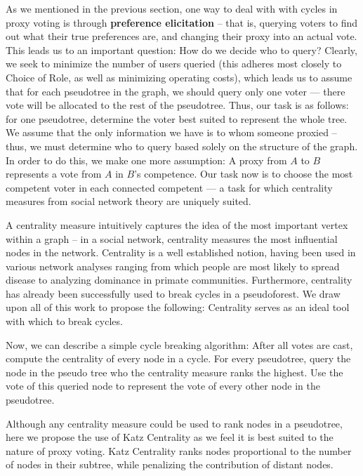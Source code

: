 \documentclass[10pt]{article}
\theoremstyle{definition}
\begin{document}
As we mentioned in the previous section, one way to deal with with cycles in proxy voting is through \textbf{preference elicitation} -- that is, querying voters to find out what their true preferences are, and changing their proxy into an actual vote. This leads us to an important question: How do we decide who to query? Clearly, we seek to minimize the number of users queried (this adheres most closely to Choice of Role, as well as minimizing operating costs), which leads us to assume that for each pseudotree in the graph, we should query only one voter --- there vote will be allocated to the rest of the pseudotree. Thus, our task is as follows: for one pseudotree, determine the voter best suited to represent the whole tree. We assume that the only information we have is to whom someone proxied -- thus, we must determine who to query based solely on the structure of the graph. In order to do this, we make one more assumption: A proxy from $A$ to $B$ represents a vote from $A$ in $B$'s competence. Our task now is to choose the most competent voter in each connected competent --- a task for which centrality measures from social network theory are uniquely suited.

A centrality measure intuitively captures the idea of the most important vertex within a graph -- in a social network, centrality measures the most influential nodes in the network.\cite{centrality}\cite{cwiki} Centrality is a well established notion, having been used in various network analyses ranging from which people are most likely to spread disease to analyzing dominance in primate communities. Furthermore, centrality has already been successfully used to break cycles in a pseudoforest.\cite{wikipedia} We draw upon all of this work to propose the following: Centrality serves as an ideal tool with which to break cycles. 

Now, we can describe a simple cycle breaking algorithm: After all votes are cast, compute the centrality of every node in a cycle. For every pseudotree, query the node in the pseudo tree who the centrality measure ranks the highest. Use the vote of this queried node to represent the vote of every other node in the pseudotree.

Although any centrality measure could be used to rank nodes in a pseudotree, here we propose the use of Katz Centrality as we feel it is best suited to the nature of proxy voting. Katz Centrality ranks nodes proportional to the number of nodes in their subtree, while penalizing the contribution of distant nodes.
\end{document}
